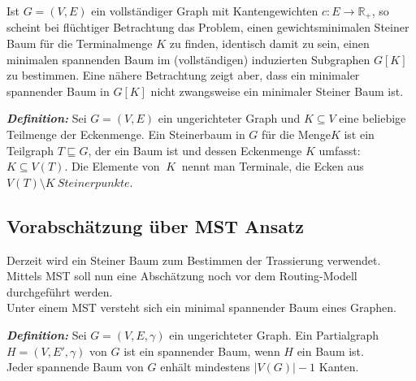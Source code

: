 \vspace{0.5cm}

Ist $G=(V, E )$ ein vollständiger Graph mit Kantengewichten $c: E \to \mathbb{R}_{+}$, so scheint bei flüchtiger Betrachtung das Problem, einen
gewichtsminimalen Steiner Baum für die Terminalmenge $K$ zu finden, identisch damit zu sein, einen minimalen spannenden Baum im (vollständigen) 
induzierten Subgraphen $G[K]$ zu bestimmen. Eine nähere Betrachtung zeigt aber, dass ein minimaler spannender Baum in $G[K]$ nicht zwangsweise ein minimaler Steiner Baum ist.
\\


\vspace{0.5cm}

\begin{graybox}
\textbf{\textit{Definition:}} Sei $G=(V, E )$ ein ungerichteter Graph und $K \subseteq V$ eine beliebige Teilmenge der Eckenmenge. Ein Steinerbaum
 in $G$ für die Menge$K$ ist ein Teilgraph $T \sqsubseteq G$, der ein Baum ist und dessen Eckenmenge $K$ umfasst: $K \subseteq V(T)$.
Die Elemente von $~K~$ nennt man Terminale, die Ecken aus $V(T) \setminus K~ Steinerpunkte$\cite{krumke1}.
\end{graybox}

\vspace{1cm}


\subsection{Vorabschätzung über MST Ansatz}
\label{sec:2methoden}


\vspace{0.5cm}

Derzeit wird ein Steiner Baum zum Bestimmen der Trassierung verwendet. Mittels MST soll nun eine Abschätzung noch vor dem Routing-Modell 
durchgeführt werden. \\
Unter einem MST versteht sich ein minimal spannender Baum eines Graphen. \\ 

\begin{graybox}
\textbf{\textit{Definition:}} Sei $G=(V, E, \gamma)$ ein ungerichteter Graph. Ein Partialgraph $H=(V,E', \gamma)$ von $G$ ist ein spannender Baum, 
wenn $H$ ein Baum ist. \\
Jeder spannende Baum von $G$ enhält mindestens $|V(G)| -1$ Kanten\cite{krumke1}.
\end{graybox}

\vspace{0.5cm}


